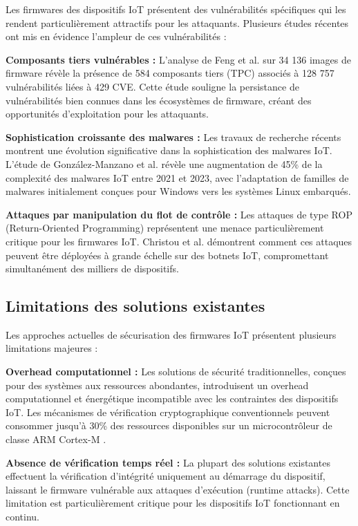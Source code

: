 Les firmwares des dispositifs \ac{IoT} présentent des vulnérabilités spécifiques qui les rendent particulièrement attractifs pour les attaquants. Plusieurs études récentes ont mis en évidence l'ampleur de ces vulnérabilités :

\textbf{Composants tiers vulnérables :} L'analyse de Feng et al. \cite{Feng2022OneBadApple} sur 34 136 images de firmware révèle la présence de 584 composants tiers (\ac{TPC}) associés à 128 757 vulnérabilités liées à 429 \ac{CVE}. Cette étude souligne la persistance de vulnérabilités bien connues dans les écosystèmes de firmware, créant des opportunités d'exploitation pour les attaquants.

\textbf{Sophistication croissante des malwares :} Les travaux de recherche récents montrent une évolution significative dans la sophistication des malwares IoT. L'étude de González-Manzano et al. \cite{Gonzalez2024ExploringShifting} révèle une augmentation de 45\% de la complexité des malwares IoT entre 2021 et 2023, avec l'adaptation de familles de malwares initialement conçues pour Windows vers les systèmes Linux embarqués.

\textbf{Attaques par manipulation du flot de contrôle :} Les attaques de type \ac{ROP} (Return-Oriented Programming) représentent une menace particulièrement critique pour les firmwares IoT. Christou et al. \cite{Christou2024DAEDALUS} démontrent comment ces attaques peuvent être déployées à grande échelle sur des botnets IoT, compromettant simultanément des milliers de dispositifs.

\subsection{Limitations des solutions existantes}

Les approches actuelles de sécurisation des firmwares IoT présentent plusieurs limitations majeures :

\textbf{Overhead computationnel :} Les solutions de sécurité traditionnelles, conçues pour des systèmes aux ressources abondantes, introduisent un overhead computationnel et énergétique incompatible avec les contraintes des dispositifs IoT. Les mécanismes de vérification cryptographique conventionnels peuvent consommer jusqu'à 30\% des ressources disponibles sur un microcontrôleur de classe ARM Cortex-M \cite{Khan2024EfficiencySecurity}.

\textbf{Absence de vérification temps réel :} La plupart des solutions existantes effectuent la vérification d'intégrité uniquement au démarrage du dispositif, laissant le firmware vulnérable aux attaques d'exécution (runtime attacks). Cette limitation est particulièrement critique pour les dispositifs IoT fonctionnant en continu.

